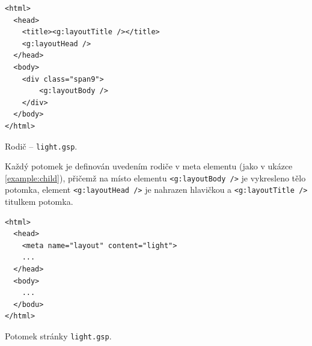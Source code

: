 \begin{example}
    \centering
    \begin{lstlisting}
<html>
  <head>
    <title><g:layoutTitle /></title>
    <g:layoutHead />
  </head>
  <body>
    <div class="span9">
        <g:layoutBody />
    </div>
  </body>
</html>
    \end{lstlisting}
    \caption{Rodič -- \texttt{light.gsp}.}
    \label{example:parent}
\end{example}

Každý potomek je definován uvedením rodiče v meta elementu (jako v ukázce \ref{example:child}), přičemž na místo elementu \texttt{<g:layoutBody />} je vykresleno tělo potomka, element \texttt{<g:layoutHead />} je nahrazen hlavičkou a \texttt{<g:layoutTitle />} titulkem potomka.
\begin{example}
    \centering
    \begin{lstlisting}
<html>
  <head>
    <meta name="layout" content="light">
    ...
  </head>
  <body>
    ...
  </bodu>
</html>
    \end{lstlisting}
    \caption{Potomek stránky \texttt{light.gsp}.}
    \label{example:child}
\end{example}

